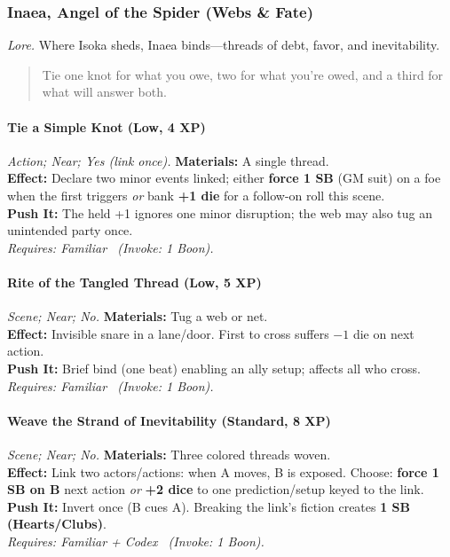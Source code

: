\subsubsection{Inaea, Angel of the Spider (Webs \& Fate)}
\textit{Lore.} Where Isoka sheds, Inaea binds—threads of debt, favor, and inevitability.

\begin{quote}
Tie one knot for what you owe, two for what you’re owed, and a third for what will answer both.
\end{quote}

\paragraph{Tie a Simple Knot (Low, 4 XP)} \emph{Action; Near; Yes (link once).}
\textbf{Materials:} A single thread.\\
\textbf{Effect:} Declare two minor events linked; either \textbf{force 1 SB} (GM suit) on a foe when the first triggers \emph{or} bank \textbf{+1 die} for a follow-on roll this scene.\\
\textbf{Push It:} The held +1 ignores one minor disruption; the web may also tug an unintended party once.\\
\emph{Requires: Familiar \ (\textit{Invoke:} 1 Boon).}

\paragraph{Rite of the Tangled Thread (Low, 5 XP)} \emph{Scene; Near; No.}
\textbf{Materials:} Tug a web or net.\\
\textbf{Effect:} Invisible snare in a lane/door. First to cross suffers \(-1\) die on next action.\\
\textbf{Push It:} Brief bind (one beat) enabling an ally setup; affects all who cross.\\
\emph{Requires: Familiar \ (\textit{Invoke:} 1 Boon).}

\paragraph{Weave the Strand of Inevitability (Standard, 8 XP)} \emph{Scene; Near; No.}
\textbf{Materials:} Three colored threads woven.\\
\textbf{Effect:} Link two actors/actions: when A moves, B is exposed. Choose: \textbf{force 1 SB on B} next action \emph{or} \textbf{+2 dice} to one prediction/setup keyed to the link.\\
\textbf{Push It:} Invert once (B cues A). Breaking the link’s fiction creates \textbf{1 SB (Hearts/Clubs)}.\\
\emph{Requires: Familiar + Codex \ (\textit{Invoke:} 1 Boon).}

